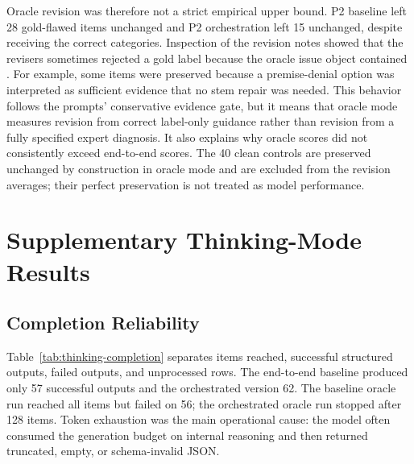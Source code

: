 \documentclass[11pt,a4paper]{article}
\newcommand{\code}[1]{%
    \texttt{\detokenize{#1}}%
}
\begin{document}
Oracle revision was therefore not a strict empirical upper bound. P2 baseline
left 28 gold-flawed items unchanged and P2 orchestration left 15 unchanged,
despite receiving the correct categories. Inspection of the revision notes
showed that the revisers sometimes rejected a gold label because the oracle
issue object contained \code{evidence=null}. For example, some
\code{loaded_question} items were preserved because a premise-denial option was
interpreted as sufficient evidence that no stem repair was needed. This behavior
follows the prompts' conservative evidence gate, but it means that oracle mode
measures revision from correct label-only guidance rather than revision from a
fully specified expert diagnosis. It also explains why oracle scores did not
consistently exceed end-to-end scores. The 40 clean controls are preserved
unchanged by construction in oracle mode and are excluded from the revision
averages; their perfect preservation is not treated as model performance.

\clearpage
\section{Supplementary Thinking-Mode Results}
\label{app:thinking}

\subsection{Completion Reliability}

Table~\ref{tab:thinking-completion} separates items reached, successful
structured outputs, failed outputs, and unprocessed rows. The end-to-end
baseline produced only 57 successful outputs and the orchestrated version 62.
The baseline oracle run reached all items but failed on 56; the orchestrated
oracle run stopped after 128 items. Token exhaustion was the main operational
cause: the model often consumed the generation budget on internal reasoning and
then returned truncated, empty, or schema-invalid JSON.

\begin{table}[H]
\centering
\caption{Thinking-mode completion. The final column gives successful clean,
         single-label, and multi-label items.}
\label{tab:thinking-completion}
\small
\setlength{\tabcolsep}{4.0pt}
\end{table}
\end{document}
